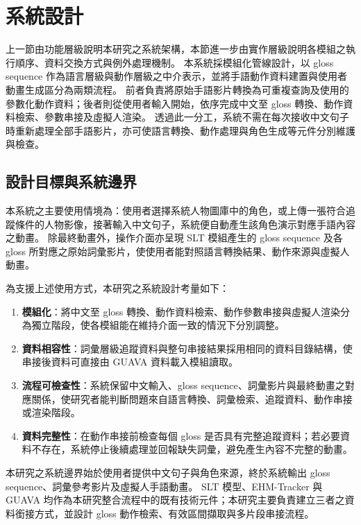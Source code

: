 \documentclass[class=NCU_thesis, crop=false]{standalone}
\begin{document}
\section{系統設計}
\label{sec:system_design}

上一節由功能層級說明本研究之系統架構，本節進一步由實作層級說明各模組之執行順序、資料交換方式與例外處理機制。
本系統採模組化管線設計，以 gloss sequence 作為語言層級與動作層級之中介表示，並將手語動作資料建置與使用者動畫生成區分為兩類流程。
前者負責將原始手語影片轉換為可重複查詢及使用的參數化動作資料；後者則從使用者輸入開始，依序完成中文至 gloss 轉換、動作資料檢索、參數串接及虛擬人渲染。
透過此一分工，系統不需在每次接收中文句子時重新處理全部手語影片，亦可使語言轉換、動作處理與角色生成等元件分別維護與檢查。

\subsection{設計目標與系統邊界}

本系統之主要使用情境為：使用者選擇系統人物圖庫中的角色，或上傳一張符合追蹤條件的人物影像，接著輸入中文句子，系統便自動產生該角色演示對應手語內容之動畫。
除最終動畫外，操作介面亦呈現 SLT 模組產生的 gloss sequence 及各 gloss 所對應之原始詞彙影片，使使用者能對照語言轉換結果、動作來源與虛擬人動畫。

為支援上述使用方式，本研究之系統設計考量如下：

\begin{enumerate}
    \item \textbf{模組化}：將中文至 gloss 轉換、動作資料檢索、動作參數串接與虛擬人渲染分為獨立階段，使各模組能在維持介面一致的情況下分別調整。
    \item \textbf{資料相容性}：詞彙層級追蹤資料與整句串接結果採用相同的資料目錄結構，使串接後資料可直接由 GUAVA 資料載入模組讀取。
    \item \textbf{流程可檢查性}：系統保留中文輸入、gloss sequence、詞彙影片與最終動畫之對應關係，使研究者能判斷問題來自語言轉換、詞彙檢索、追蹤資料、動作串接或渲染階段。
    \item \textbf{資料完整性}：在動作串接前檢查每個 gloss 是否具有完整追蹤資料；若必要資料不存在，系統停止後續處理並回報缺失詞彙，避免產生內容不完整的動畫。
\end{enumerate}

本研究之系統邊界始於使用者提供中文句子與角色來源，終於系統輸出 gloss sequence、詞彙參考影片及虛擬人手語動畫。
SLT 模型、EHM-Tracker 與 GUAVA 均作為本研究整合流程中的既有技術元件；本研究主要負責建立三者之資料銜接方式，並設計 gloss 動作檢索、有效區間擷取與多片段串接流程。
\end{document}
